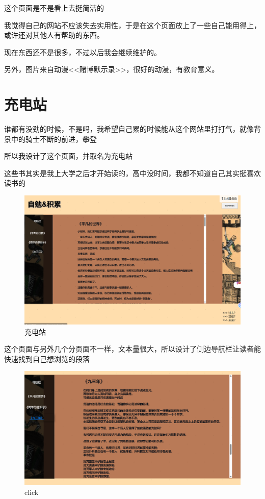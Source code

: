 \documentclass[supercite]{Experimental_Report}
\theoremstyle{definition}
\begin{document}
这个页面是不是看上去挺简洁的

我觉得自己的网站不应该失去实用性，于是在这个页面放上了一些自己能用得上，或许还对其他人有帮助的东西。

现在东西还不是很多，不过以后我会继续维护的。

另外，图片来自动漫<<赌博默示录>>，很好的动漫，有教育意义。

\newpage
\section{充电站}

谁都有没劲的时候，不是吗，我希望自己累的时候能从这个网站里打打气，就像背景中的骑士不断的前进，攀登

所以我设计了这个页面，并取名为充电站

这些书其实是我上大学之后才开始读的，高中没时间，我都不知道自己其实挺喜欢读书的

\begin{figure}[htb]
	\begin{center}
		\includegraphics[scale=0.40]{images/6-1.png}
		\caption{充电站}
		\label{fig6-1}
	\end{center}
\end{figure}

这个页面与另外几个分页面不一样，文本量很大，所以设计了侧边导航栏让读者能快速找到自己想浏览的段落
\begin{figure}[htb]
	\begin{center}
		\includegraphics[scale=0.40]{images/6-2.png}
		\caption{click}
		\label{fig6-2}
	\end{center}
\end{figure}
\end{document}
